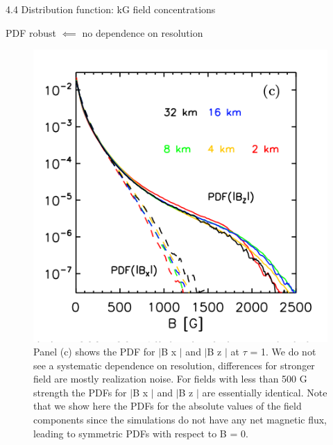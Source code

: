 \documentclass{beamer}
\begin{document}
\begin{frame}{}
4.4 Distribution function: kG field concentrations
\end{frame}

\begin{frame}{PDF  robust $\impliedby $ no dependence on resolution}

\begin{figure}[H]
 \centering
 \includegraphics[scale=0.3]{img44-1.png}
	\caption{
Panel (c) shows the PDF for $\lvert$B x $\rvert$ and $\lvert$B z $\rvert$ at $\tau$ = 1. We do
not see a systematic dependence on resolution, differences for
stronger field are mostly realization noise. For fields with less
than 500 G strength the PDFs for $\lvert$B x $\rvert$ and $\lvert$B z $\rvert$ are essentially
identical. Note that we show here the PDFs for the absolute values of the field components since the simulations do not have
any net magnetic flux, leading to symmetric PDFs with respect
to B = 0.}
\end{figure}




\end{frame}
\end{document}
